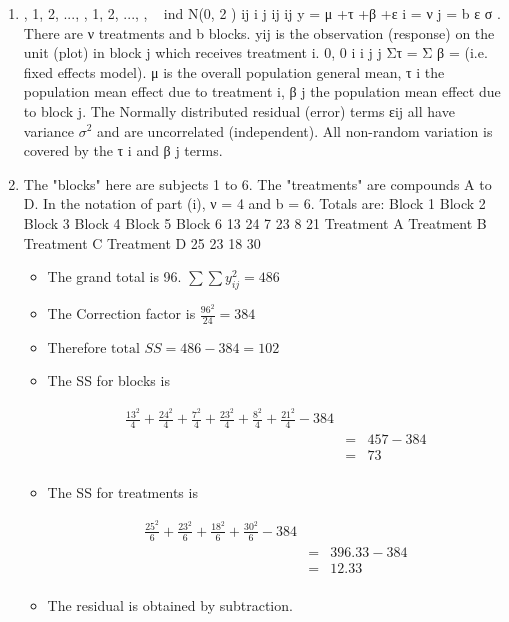\documentclass[a4paper,12pt]{article}
\begin{document}
\begin{enumerate}
\item , 1, 2, ..., , 1, 2, ..., , { } ~ ind N(0, 2 ) ij i j ij ij y = μ +τ +β +ε i = ν j = b ε σ .
There are ν treatments and b blocks. yij is the observation (response) on the unit (plot)
in block j which receives treatment i. 0, 0 i i j j Στ = Σ β = (i.e. fixed effects model).
μ is the overall population general mean, τ
i the population mean effect due to
treatment i, β
j the population mean effect due to block j. The Normally distributed
residual (error) terms εij all have variance $\sigma^2$ and are uncorrelated (independent). All
non-random variation is covered by the τ
i and β
j terms.
\item The "blocks" here are subjects 1 to 6. The "treatments" are compounds A to
D. In the notation of part (i), ν = 4 and b = 6.
Totals are: Block 1 Block 2 Block 3 Block 4 Block 5 Block 6
13 24 7 23 8 21
Treatment A Treatment B Treatment C Treatment D
25 23 18 30

\begin{itemize}
\item The grand total is 96. $\sum \sum y_{ij}^2 =486$

\item The Correction factor is $ \frac{96^2}{24} = 384 $

\item Therefore $ \mbox{total }SS = 486 - 384 = 102$

\item The SS for blocks is

\begin{eqnarray*} 
\frac{13^2}{4} + \frac{24^2}{4} + \frac{7^2}{4} + \frac{23^2}{4} + \frac{8^2}{4} + \frac{21^2}{4} - 384\\
&=& 457 - 384 \\
&=& 73 \\
\end{eqnarray*}
\item The SS for treatments is

\begin{eqnarray*} 
\frac{25^2}{6} + \frac{23^2}{6} + \frac{18^2}{6} + \frac{30^2}{6} - 384\\
&=& 396.33 - 384 \\
&=& 12.33 \\
\end{eqnarray*}

\item The residual is obtained by subtraction.
\end{itemize}


\end{enumerate}
\end{document}
